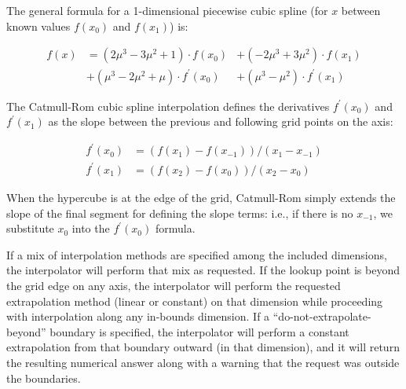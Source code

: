 The general formula for a 1-dimensional piecewise cubic spline (for
\(x\) between known values \(f\left(x_0\right)\) and
\(f\left(x_1\right)\)) is:

\[\begin{array}{rll}
    f\left(x\right) &= \left(2\mu^3 - 3\mu^2 + 1\right) \cdot f\left(x_0\right)
    &+ \left(-2\mu^3 + 3\mu^2\right) \cdot f\left(x_1\right) \\
    &+ \left(\mu^3 - 2\mu^2 + \mu\right) \cdot f^\prime \left(x_0\right)
    &+ \left(\mu^3 - \mu^2\right) \cdot f^\prime \left(x_1\right)
\end{array}\]

The Catmull-Rom cubic spline interpolation defines the derivatives
\(f^\prime \left(x_0\right)\) and \(f^\prime\left(x_1\right)\) as the
slope between the previous and following grid points on the axis:

\[\begin{array}{rl}
    f^\prime(x_0) &= ( f(x_1) - f(x_{-1}) ) / ( x_1 - x_{-1}) \\
    f^\prime(x_1) &= ( f(x_2) - f(x_0) ) / ( x_2 - x_0)
\end{array}\]

When the hypercube is at the edge of the grid, Catmull-Rom simply
extends the slope of the final segment for defining the slope terms:
i.e., if there is no \(x_{-1}\), we substitute \(x_0\) into the
\(f^\prime(x_0)\) formula.

If a mix of interpolation methods are specified among the included
dimensions, the interpolator will perform that mix as requested.
If the lookup point is beyond the grid edge on any axis, the interpolator
will perform the requested extrapolation method (linear or constant) on
that dimension while proceeding with interpolation along any in-bounds
dimension. If a ``do-not-extrapolate-beyond'' boundary is specified, the
interpolator will perform a constant extrapolation from that boundary outward
(in that dimension), and it will return the resulting numerical answer
along with a warning that the request was outside the boundaries.

